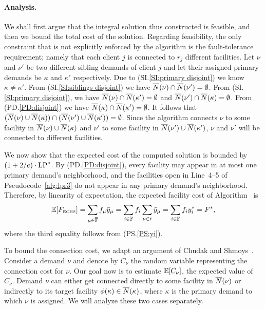 \documentclass[oneside,final]{ucr}
\begin{document}
\paragraph{Analysis.}
We shall first argue that the integral solution thus
constructed is feasible, and then we bound the total cost of
the solution. Regarding feasibility, the only constraint
that is not explicitly enforced by the algorithm is the
fault-tolerance requirement; namely that each client $j$ is
connected to $r_j$ different facilities. Let $\nu$ and
$\nu'$ be two different sibling demands of client $j$ and let
their assigned primary demands be $\kappa$ and $\kappa'$
respectively. Due to (SI.\ref{SI:primary
  disjoint}) we know $\kappa \neq \kappa'$. From
(SI.\ref{SI:siblings disjoint}) we have ${\overline{N}}(\nu) \cap
{\overline{N}}(\nu') = \emptyset$. From (SI.\ref{SI:primary
  disjoint}), we have ${\overline{N}}(\nu) \cap {\overline{N}}(\kappa') =
\emptyset$ and ${\overline{N}}(\nu') \cap {\overline{N}}(\kappa) =
\emptyset$. From (PD.\ref{PD:disjoint}) we have
${\overline{N}}(\kappa)\cap {\overline{N}}(\kappa') = \emptyset$. It follows
that $({\overline{N}}(\nu) \cup {\overline{N}}(\kappa)) \cap ({\overline{N}}(\nu')
\cup {\overline{N}}(\kappa')) = \emptyset$. Since the algorithm
connects $\nu$ to some facility in ${\overline{N}}(\nu) \cup
{\overline{N}}(\kappa)$ and $\nu'$ to some facility in ${\overline{N}}(\nu')
\cup {\overline{N}}(\kappa')$, $\nu$ and $\nu'$ will be connected to
different facilities.



\smallskip
We now show that the expected cost of the computed solution is bounded by
$(1+2/e) \cdot \mbox{\rm LP}^\ast$. By
(PD.\ref{PD:disjoint}), every facility may appear in at
most one primary demand's neighborhood, and the facilities
open in Line~4--5 of Pseudocode~\ref{alg:lpr3} do not appear
in any primary demand's neighborhood. Therefore, by
linearity of expectation, the expected facility cost of
Algorithm~{\ECHS} is 
%
\begin{equation*}
\mathbb{E}[F_{\mbox{\tiny\rm ECHS}}] 
	= \sum_{\mu\in\overline{\mathbb{F}}} f_\mu {\bar y}_{\mu} 
	= \sum_{i\in\mathbb{F}} f_i\sum_{\mu\in i} {\bar y}_{\mu} 
	= \sum_{i\in\mathbb{F}} f_i y_i^\ast = F^\ast,
\end{equation*}
%
where the third equality follows from (PS.\ref{PS:yi}).

\smallskip

To bound the connection cost, we adapt an argument of Chudak
and Shmoys~\cite{ChudakS04}. Consider a demand $\nu$ and denote by $C_\nu$ the
random variable representing the connection cost for $\nu$.
Our goal now is to estimate $\mathbb{E}[C_\nu]$, the expected value of $C_\nu$.
Demand $\nu$ can either get connected directly to some facility in
${\overline{N}}(\nu)$ or indirectly to its target facility $\phi(\kappa)\in
{\overline{N}}(\kappa)$, where $\kappa$ is the primary demand to
which $\nu$ is assigned. We will analyze these two cases separately.
\end{document}
